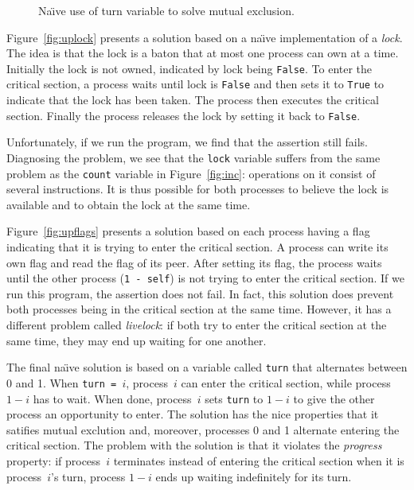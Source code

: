 \documentclass{report}
\newenvironment{code}{
\tcolorbox
}{
\endtcolorbox
}
\begin{document}
\begin{figure}
\begin{code}

\end{code}
\caption{Na\"{\i}ve use of turn variable to solve mutual exclusion.}
\label{fig:upturn}
\end{figure}

Figure~\ref{fig:uplock} presents a solution based on a na\"{\i}ve implementation
of a \emph{lock}.
The idea is that the lock is a baton that at most one process can own at
a time.
Initially the lock is not owned, indicated by lock being \texttt{False}.
To enter the critical section, a process waits until lock is \texttt{False}
and then sets it to \texttt{True} to indicate that the lock has been taken.
The process then executes the critical section.  Finally the process
releases the lock by setting it back to \texttt{False}.

Unfortunately, if we run the program, we find that the assertion still
fails.  Diagnosing the problem, we see that the \texttt{lock} variable
suffers from the same problem as the \texttt{count} variable
in Figure~\ref{fig:inc}: operations
on it consist of several instructions.  It is thus possible
for both processes to believe the lock is available and to obtain the lock
at the same time.

Figure~\ref{fig:upflags} presents a solution based on each process having
a flag indicating that it is trying to enter the critical section.
A process can write its own flag and read the flag of its peer.
After setting its flag, the process waits until the other process
(\texttt{1 - self}) is not trying to enter the critical section.
If we run this program, the assertion does not fail.  In fact, this
solution does prevent both processes being in the critical section at
the same time.
However, it has a different problem called \emph{livelock}: if both try to
enter the critical section at the same time, they may end up waiting for
one another.

The final na\"{\i}ve solution is based on a variable called \texttt{turn}
that alternates between 0 and 1.  When \texttt{turn = $i$}, process~$i$ can
enter the critical section, while process $1-i$ has to wait.  When done,
process~$i$ sets \texttt{turn} to $1-i$ to give the other process an
opportunity to enter.
The solution has the nice properties that it satifies mutual exclution and,
moreover, processes 0 and 1 alternate entering the critical section.
The problem with the solution is
that it violates the \emph{progress} property:
if process~$i$ terminates instead of entering the critical section when it
is process~$i$'s turn, process $1-i$ ends up waiting indefinitely for its
turn.
\end{document}
